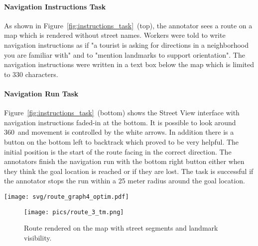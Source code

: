 \documentclass[11pt,a4paper]{article}
\begin{document}
\paragraph{Navigation Instructions Task}
As shown in Figure~\ref{fig:instructions_task}~(top), the annotator sees a route on a map which is rendered without street names. Workers were told to write navigation instructions as if "a tourist is asking for directions in a neighborhood you are familiar with" and to "mention landmarks to support orientation". The navigation instructions were written in a text box below the map which is limited to 330 characters.

\paragraph{Navigation Run Task}
Figure~\ref{fig:instructions_task}~(bottom) shows the Street View interface with navigation instructions faded-in at the bottom. It is possible to look around 360\degree~and movement is controlled by the white arrows. In addition there is a button on the bottom left to backtrack which proved to be very helpful. The initial position is the start of the route facing in the correct direction. The annotators finish the navigation run with the bottom right button either when they think the goal location is reached or if they are lost. The task is successful if the annotator stops the run within a 25 meter radius around the goal location.

\begin{figure*}[ht!]
    \centering
    \texttt{[image: svg/route\_graph4\_optim.pdf]}
    \caption{Graph representation of the route in Figure~\ref{fig:graph_construction}. The framed middle part is magnified for readability. Some nodes are left out for sake of clear visualization. Also, node colors are for visualization only and not encoded in the graph. Green nodes are part of the route. Blue nodes are neighboring street segments. Orange nodes belong to OSM points of interest. Angles are relative to route direction and start clockwise at 0\degree~which is facing forward.}
    \label{fig:graph}
\end{figure*}

\begin{figure}[ht!]
  \texttt{[image: pics/route\_3\_tm.png]}
  \caption{Route rendered on the map with street segments and landmark visibility.}
  \label{fig:graph_construction}
\end{figure}
\end{document}

